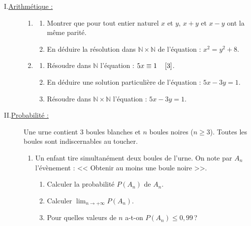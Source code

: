       \begin{description}
            \item[I.\underline{Arithm\'etique :}]
                  \begin{enumerate}
                        \item \begin{enumerate}
                                    \item Montrer que pour tout entier naturel $x$ et $y$, $x+y$ et $x-y$ ont la m\^eme parit\'e.
                                    \item En d\'eduire la r\'esolution dans $\mathbb{N} \times \mathbb{N}$ de l'\'equation : 
                                          $x^2 = y^2 + 8$.
                              \end{enumerate}
                        \item \begin{enumerate}
                                    \item R\'esoudre dans $\mathbb{N}$ l'\'equation : $5x \equiv 1 \quad \left[\mathrm{3}\right]$.
                                    \item En d\'eduire une solution particuli\`ere de l'\'equation : $5x-3y = 1$.
                                    \item R\'esoudre dans $\mathbb{N} \times \mathbb{N}$ l'\'equation : $5x-3y=1$.
                              \end{enumerate}
                  \end{enumerate}
            \item[II.\underline{Probabilit\'e :}]
                  Une urne contient 3 boules blanches et $n$ boules noires ($n\geq 3$).
                  Toutes les boules sont indiscernables au toucher.
                  \begin{enumerate}
                        \item Un enfant tire simultan\'ement deux boules de l'urne.
                              On note par $A_n$ l'\'ev\`enement : 
                              << Obtenir au moins une boule noire >>.
                              \begin{enumerate}
                                    \item Calculer la probabilit\'e $P(A_n)$ de $A_n$.
                                    \item Calculer $\lim_{n\rightarrow +\infty} P(A_n)$.
                                    \item Pour quelles valeurs de $n$ a-t-on $P(A_n) \leq 0,99$\,?

\end{enumerate}
\end{enumerate}
\end{description}
